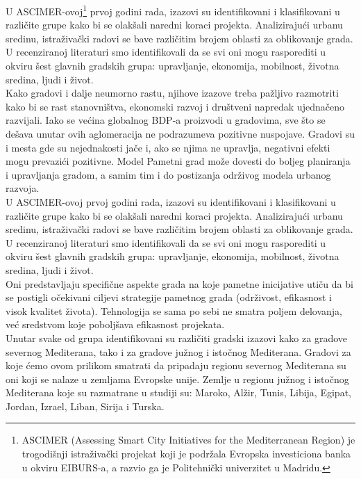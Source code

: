 \documentclass[a4paper,12pt]{article}
\begin{document}
{U ASCIMER-ovoj\footnote{ASCIMER (Assessing Smart City Initiatives for the Mediterranean Region) je trogodišnji istraživački projekat koji je podržala Evropska investiciona banka u okviru EIBURS-a, a razvio ga je Politehnički univerzitet u Madridu.} prvoj godini rada, izazovi su identifikovani i klasifikovani u različite grupe kako bi se olakšali naredni koraci projekta. Analizirajući urbanu sredinu, istraživački radovi se bave različitim brojem oblasti za oblikovanje grada. U recenziranoj literaturi smo identifikovali da se svi oni mogu rasporediti u okviru šest glavnih gradskih grupa: upravljanje, ekonomija, mobilnost, životna sredina, ljudi i život. \\

 Kako gradovi i dalje neumorno rastu, njihove izazove treba pažljivo razmotriti kako bi se rast stanovništva, ekonomski razvoj i društveni napredak ujednačeno razvijali. Iako se većina globalnog BDP-a proizvodi u gradovima, sve što se dešava unutar ovih aglomeracija ne podrazumeva pozitivne nuspojave. Gradovi su i mesta gde su nejednakosti jače i, ako se njima ne upravlja, negativni efekti mogu prevazići pozitivne. Model Pametni grad može dovesti do boljeg planiranja i upravljanja gradom, a samim tim i do postizanja održivog modela urbanog razvoja.\cite{referenca4} \\

U ASCIMER-ovoj prvoj godini rada, izazovi su identifikovani i klasifikovani u različite grupe kako bi se olakšali naredni koraci projekta. Analizirajući urbanu sredinu, istraživački radovi se bave različitim brojem oblasti za oblikovanje grada. U recenziranoj literaturi smo identifikovali da se svi oni mogu rasporediti u okviru šest glavnih gradskih grupa: upravljanje, ekonomija, mobilnost, životna sredina, ljudi i život. \\


Oni predstavljaju specifične aspekte grada na koje pametne inicijative utiču da bi se postigli očekivani ciljevi strategije pametnog grada (održivost, efikasnost i visok kvalitet života). Tehnologija se sama po sebi ne smatra poljem delovanja, već sredstvom koje poboljšava efikasnost projekata. \\

Unutar svake od grupa identifikovani su različiti gradski izazovi kako za gradove severnog Mediterana, tako i za gradove južnog i istočnog Mediterana. Gradovi za koje ćemo ovom prilikom smatrati da pripadaju regionu severnog Mediterana su oni koji se nalaze u zemljama Evropske unije. Zemlje u regionu južnog i istočnog Mediterana koje su razmatrane u studiji su: Maroko, Alžir, Tunis, Libija, Egipat, Jordan, Izrael, Liban, Sirija i Turska. \\

}
\end{document}
